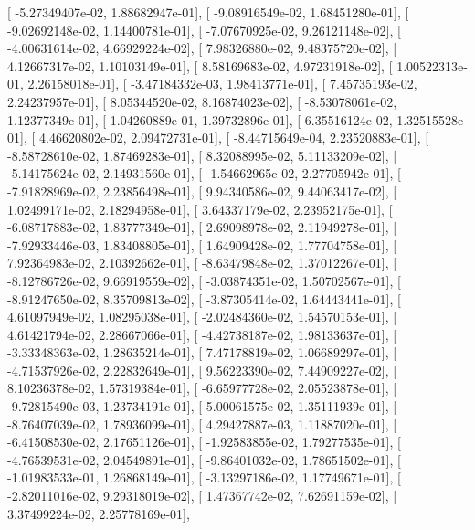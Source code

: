 \documentclass{article}
\begin{document}
       [ -5.27349407e-02,   1.88682947e-01],
       [ -9.08916549e-02,   1.68451280e-01],
       [ -9.02692148e-02,   1.14400781e-01],
       [ -7.07670925e-02,   9.26121148e-02],
       [ -4.00631614e-02,   4.66929224e-02],
       [  7.98326880e-02,   9.48375720e-02],
       [  4.12667317e-02,   1.10103149e-01],
       [  8.58169683e-02,   4.97231918e-02],
       [  1.00522313e-01,   2.26158018e-01],
       [ -3.47184332e-03,   1.98413771e-01],
       [  7.45735193e-02,   2.24237957e-01],
       [  8.05344520e-02,   8.16874023e-02],
       [ -8.53078061e-02,   1.12377349e-01],
       [  1.04260889e-01,   1.39732896e-01],
       [  6.35516124e-02,   1.32515528e-01],
       [  4.46620802e-02,   2.09472731e-01],
       [ -8.44715649e-04,   2.23520883e-01],
       [ -8.58728610e-02,   1.87469283e-01],
       [  8.32088995e-02,   5.11133209e-02],
       [ -5.14175624e-02,   2.14931560e-01],
       [ -1.54662965e-02,   2.27705942e-01],
       [ -7.91828969e-02,   2.23856498e-01],
       [  9.94340586e-02,   9.44063417e-02],
       [  1.02499171e-02,   2.18294958e-01],
       [  3.64337179e-02,   2.23952175e-01],
       [ -6.08717883e-02,   1.83777349e-01],
       [  2.69098978e-02,   2.11949278e-01],
       [ -7.92933446e-03,   1.83408805e-01],
       [  1.64909428e-02,   1.77704758e-01],
       [  7.92364983e-02,   2.10392662e-01],
       [ -8.63479848e-02,   1.37012267e-01],
       [ -8.12786726e-02,   9.66919559e-02],
       [ -3.03874351e-02,   1.50702567e-01],
       [ -8.91247650e-02,   8.35709813e-02],
       [ -3.87305414e-02,   1.64443441e-01],
       [  4.61097949e-02,   1.08295038e-01],
       [ -2.02484360e-02,   1.54570153e-01],
       [  4.61421794e-02,   2.28667066e-01],
       [ -4.42738187e-02,   1.98133637e-01],
       [ -3.33348363e-02,   1.28635214e-01],
       [  7.47178819e-02,   1.06689297e-01],
       [ -4.71537926e-02,   2.22832649e-01],
       [  9.56223390e-02,   7.44909227e-02],
       [  8.10236378e-02,   1.57319384e-01],
       [ -6.65977728e-02,   2.05523878e-01],
       [ -9.72815490e-03,   1.23734191e-01],
       [  5.00061575e-02,   1.35111939e-01],
       [ -8.76407039e-02,   1.78936099e-01],
       [  4.29427887e-03,   1.11887020e-01],
       [ -6.41508530e-02,   2.17651126e-01],
       [ -1.92583855e-02,   1.79277535e-01],
       [ -4.76539531e-02,   2.04549891e-01],
       [ -9.86401032e-02,   1.78651502e-01],
       [ -1.01983533e-01,   1.26868149e-01],
       [ -3.13297186e-02,   1.17749671e-01],
       [ -2.82011016e-02,   9.29318019e-02],
       [  1.47367742e-02,   7.62691159e-02],
       [  3.37499224e-02,   2.25778169e-01],
\end{document}
